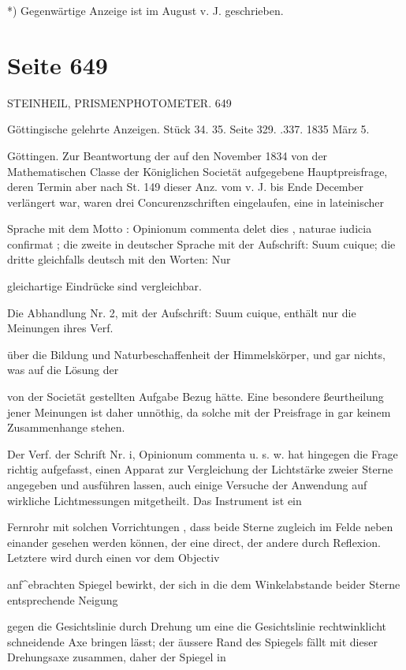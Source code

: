 \documentclass[10pt,a4paper]{article}
\begin{document}
*) Gegenwärtige Anzeige ist im August v. J. geschrieben.


\newpage
\section*{Seite 649}
STEINHEIL, PRISMENPHOTOMETER. 649

Göttingische gelehrte Anzeigen. Stück 34. 35. Seite 329. .337. 1835 März 5.

Göttingen. Zur Beantwortung der auf den November 1834 von der Mathematischen Classe der Königlichen Societät aufgegebene Hauptpreisfrage, deren Termin aber nach St. 149 dieser Anz. vom v. J. bis Ende December verlängert war, waren drei Concurenzschriften eingelaufen, eine in lateinischer

Sprache mit dem Motto : Opinionum commenta delet dies , naturae iudicia confirmat ; die zweite in deutscher Sprache mit der Aufschrift: Suum cuique; die dritte gleichfalls deutsch mit den Worten: Nur

gleichartige Eindrücke sind vergleichbar.

Die Abhandlung Nr. 2, mit der Aufschrift: Suum cuique, enthält nur die Meinungen ihres Verf.

über die Bildung und Naturbeschaffenheit der Himmelskörper, und gar nichts, was auf die Lösung der

von der Societät gestellten Aufgabe Bezug hätte. Eine besondere ßeurtheilung jener Meinungen ist daher unnöthig, da solche mit der Preisfrage in gar keinem Zusammenhange stehen.

Der Verf. der Schrift Nr. i, Opinionum commenta u. s. w. hat hingegen die Frage richtig aufgefasst, einen Apparat zur Vergleichung der Lichtstärke zweier Sterne angegeben und ausführen lassen, auch einige Versuche der Anwendung auf wirkliche Lichtmessungen mitgetheilt. Das Instrument ist ein

Fernrohr mit solchen Vorrichtungen , dass beide Sterne zugleich im Felde neben einander gesehen werden können, der eine direct, der andere durch Reflexion. Letztere wird durch einen vor dem Objectiv

anf\textasciicircum{}ebrachten Spiegel bewirkt, der sich in die dem Winkelabstande beider Sterne entsprechende Neigung

gegen die Gesichtslinie durch Drehung um eine die Gesichtslinie rechtwinklicht schneidende Axe bringen lässt; der äussere Rand des Spiegels fällt mit dieser Drehungsaxe zusammen, daher der Spiegel in
\end{document}
